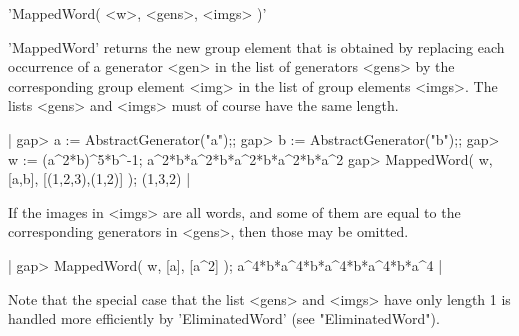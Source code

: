 
'MappedWord( <w>, <gens>, <imgs> )'

'MappedWord' returns the new group element that is obtained  by replacing
each occurrence of a generator <gen> in the list of  generators <gens> by
the corresponding  group  element <img> in  the  list  of group  elements
<imgs>.  The lists <gens> and <imgs> must of course have the same length.

|    gap> a := AbstractGenerator("a");;
    gap> b := AbstractGenerator("b");;
    gap> w := (a^2*b)^5*b^-1;
    a^2*b*a^2*b*a^2*b*a^2*b*a^2
    gap> MappedWord( w, [a,b], [(1,2,3),(1,2)] );
    (1,3,2) |

If the images in  <imgs> are all words, and some of them are equal to the
corresponding generators in <gens>, then those may be omitted.

|    gap> MappedWord( w, [a], [a^2] );
    a^4*b*a^4*b*a^4*b*a^4*b*a^4 |

Note that the special case that  the list  <gens>  and  <imgs>  have only
length   1  is  handled   more  efficiently   by  'EliminatedWord'   (see
"EliminatedWord").




